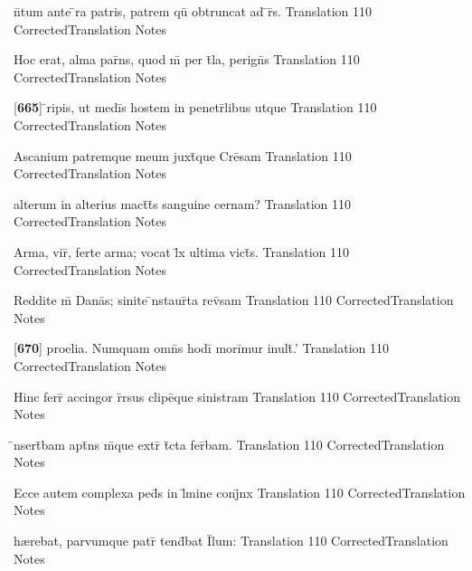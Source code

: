 \latline
  {n\={}tum ante \={}ra patris, patrem qu\={\macron {\i}} obtruncat ad \={}r\={}s.}
  { Translation }
  {110}
  { CorrectedTranslation }
  { Notes }


\latline
  {Hoc erat, alma par\={}ns, quod m\={} per t\={}la, perign\={\macron {\i}}s}
  { Translation }
  {110}
  { CorrectedTranslation }
  { Notes }


\latline
  {[\textbf{665}] \={}ripis, ut medi\={\macron {\i}}s hostem in penetr\={}libus utque}
  { Translation }
  {110}
  { CorrectedTranslation }
  { Notes }


\latline
  {Ascanium patremque meum juxt\={}que Cre\={}sam}
  { Translation }
  {110}
  { CorrectedTranslation }
  { Notes }


\latline
  {alterum in alterius mact\={}t\={}s sanguine cernam?}
  { Translation }
  {110}
  { CorrectedTranslation }
  { Notes }


\latline
  {Arma, vir\={\macron {\i}}, ferte arma; vocat l\={}x ultima vict\={}s.}
  { Translation }
  {110}
  { CorrectedTranslation }
  { Notes }


\latline
  {Reddite m\={} Dana\={\macron {\i}}s; sinite \={\macron {\i}}nstaur\={}ta rev\={\macron {\i}}sam}
  { Translation }
  {110}
  { CorrectedTranslation }
  { Notes }


\latline
  {[\textbf{670}] proelia.  Numquam omn\={}s hodi\={} mori\={}mur inult\={\macron {\i}}.'}
  { Translation }
  {110}
  { CorrectedTranslation }
  { Notes }


\latline
  {Hinc ferr\={} accingor r\={}rsus clipe\={}que sinistram}
  { Translation }
  {110}
  { CorrectedTranslation }
  { Notes }


\latline
  {\={\macron {\i}}nsert\={}bam apt\={}ns m\={}que extr\={} t\={}cta fer\={}bam.}
  { Translation }
  {110}
  { CorrectedTranslation }
  { Notes }


\latline
  {Ecce autem complexa ped\={}s in l\={\macron {\i}}mine conj\={}nx}
  { Translation }
  {110}
  { CorrectedTranslation }
  { Notes }


\latline
  {h{\ae}rebat, parvumque patr\={\macron {\i}} tend\={}bat I\={}lum:}
  { Translation }
  {110}
  { CorrectedTranslation }
  { Notes }


